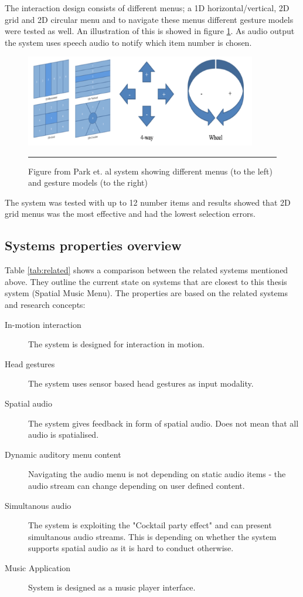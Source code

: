 The interaction design consists of different menus; a 1D horizontal/vertical, 2D grid and 2D circular menu and to navigate these menus different gesture models were tested as well. An illustration of this is showed in figure \ref{fig:park-menus}. As audio output the system uses speech audio to notify which item number is chosen.

\begin{figure}[t]
	\centering
		\includegraphics[width=0.9\textwidth,height=\textheight,keepaspectratio]{./Figures/park-menus.png}
		\rule{35em}{0.5pt}
	\caption[Park menus]{Figure from Park et. al \cite{park_gaze-directed_2011} system showing different menus (to the left) and gesture models (to the right)}
	\label{fig:park-menus}
\end{figure}

The system was tested with up to 12 number items and results showed that 2D grid menus was the most effective and had the lowest selection errors.


\subsection{Systems properties overview}
Table \ref{tab:related} shows a comparison between the related systems mentioned above. They outline the current state on systems that are closest to this thesis system (Spatial Music Menu). The properties are based on the related systems and research concepts:

\begin{description}
\item[In-motion interaction]
The system is designed for interaction in motion.

\item[Head gestures]
The system uses sensor based head gestures as input modality.

\item[Spatial audio]
The system gives feedback in form of spatial audio. Does not mean that all audio is spatialised.

\item[Dynamic auditory menu content]
Navigating the audio menu is not depending on static audio items - the audio stream can change depending on user defined content.

\item[Simultanous audio]
The system is exploiting the "Cocktail party effect" and can present simultanous audio streams. This is depending on whether the system supports spatial audio as it is hard to conduct otherwise.

\item[Music Application]
System is designed as a music player interface.
\end{description}

